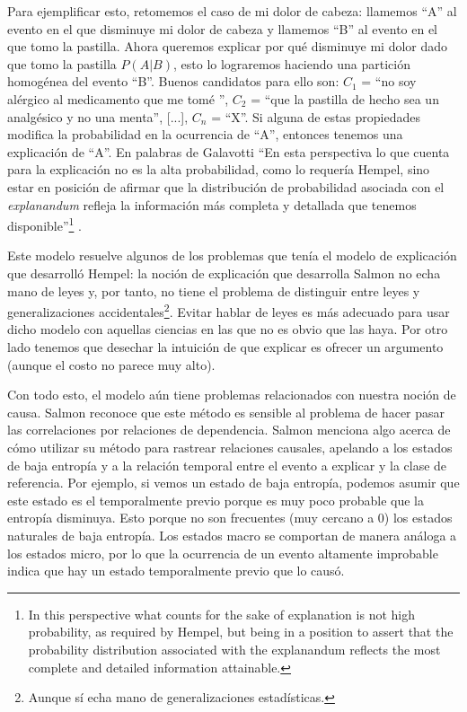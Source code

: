 Para ejemplificar esto, retomemos el caso de mi dolor de cabeza: llamemos ``A'' al evento en el que disminuye mi dolor de cabeza y llamemos ``B'' al evento en el que tomo la pastilla. Ahora queremos explicar por qué disminuye mi dolor dado que tomo la pastilla $P(A|B)$, esto lo lograremos haciendo una partición homogénea del evento ``B''. Buenos candidatos para ello son: $C_{1}$ = ``no soy alérgico al medicamento que me tomé '', $C_{2}$ = ``que la pastilla de hecho sea un analgésico y no una menta'', [...], $C_{n}$ = ``X''. Si alguna de estas propiedades modifica la probabilidad en la ocurrencia de ``A'', entonces tenemos una explicación de ``A''. En palabras de Galavotti ``En esta perspectiva lo que cuenta para la explicación no es la alta probabilidad, como lo requería Hempel, sino estar en posición de afirmar que la distribución de probabilidad asociada con el \textit{explanandum} refleja la información más completa y detallada que tenemos disponible''\footnote{In this perspective what counts for the sake of explanation is not high probability, as required by Hempel, but being in a position to assert that the probability distribution associated with the explanandum reflects the most complete and detailed information attainable.} \cite{Galavotti2018}.

Este modelo resuelve algunos de los problemas que tenía el modelo de explicación que desarrolló Hempel: la noción de explicación que desarrolla Salmon no echa mano de leyes y, por tanto, no tiene el problema de distinguir entre leyes y generalizaciones accidentales\footnote{Aunque sí echa mano de generalizaciones estadísticas.}. Evitar hablar de leyes es más adecuado para usar dicho modelo con aquellas ciencias en las que no es obvio que las haya. Por otro lado tenemos que desechar la intuición de que explicar es ofrecer un argumento (aunque el costo no parece muy alto).

Con todo esto, el modelo aún tiene problemas relacionados con nuestra noción de causa. Salmon reconoce que este método es sensible al problema de hacer pasar las correlaciones por relaciones de dependencia. Salmon menciona algo acerca de cómo utilizar su método para rastrear relaciones causales, apelando a los estados de baja entropía y a la relación temporal entre el evento a explicar y la clase de referencia. Por ejemplo, si vemos un estado de baja entropía, podemos asumir que este estado es el temporalmente previo porque es muy poco probable que la entropía disminuya. Esto porque no son frecuentes (muy cercano a 0) los estados naturales de baja entropía. Los estados macro se comportan de manera análoga a los estados micro, por lo que la ocurrencia de un evento altamente improbable indica que hay un estado temporalmente previo que lo causó.

